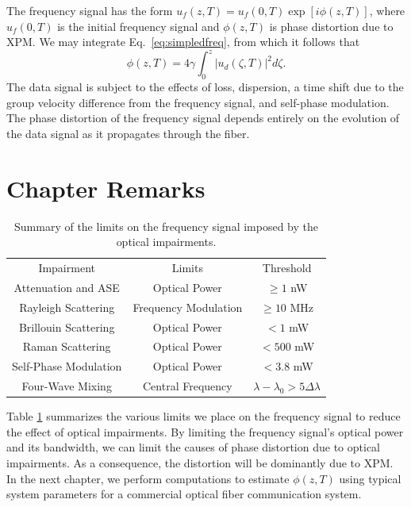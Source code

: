 The frequency signal has the form $u_f(z,T) = u_f(0,T)\exp[i\phi(z,T)]$, where $u_f(0,T)$ is the initial frequency signal and $\phi(z,T)$ is phase distortion due to XPM. We may integrate Eq.~\ref{eq:simpledfreq}, from which it follows that
%
\begin{equation} \label{eq:phasedistort}
	\phi(z,T) = 4\gamma\int_0^{z} |u_d(\zeta, T)|^2 d\zeta.
\end{equation}
%
The data signal is subject to the effects of loss, dispersion, a time shift due to the group velocity difference from the frequency signal, and self-phase modulation. The phase distortion of the frequency signal depends entirely on the evolution of the data signal as it propagates through the fiber.

\section{Chapter Remarks} \label{sec:3conc}

\renewcommand{\baselinestretch}{1}
\small\normalsize

\begin{table}[h]
	\raggedright
	\begin{tabular}{| c | c | c |}
		\hline
		Impairment & Limits & Threshold \\ \hhline{|=|=|=|}
		Attenuation and ASE & Optical Power & $\ge 1$ nW \\ \hline
		Rayleigh Scattering & Frequency Modulation & $\ge 10$ MHz \\ \hline
		Brillouin Scattering & Optical Power & $< 1$ mW \\ \hline
		Raman Scattering & Optical Power & $< 500$ mW \\ \hline
		Self-Phase Modulation & Optical Power & $< 3.8$ mW \\ \hline
		Four-Wave Mixing & Central Frequency & $\lambda - \lambda_0 > 5\Delta\lambda$ \\ 
		\hline
	\end{tabular}
	\caption{Summary of the limits on the frequency signal imposed by the optical impairments. \label{table:limits}}
\end{table}

\renewcommand{\baselinestretch}{2}
\small\normalsize

Table \ref{table:limits} summarizes the various limits we place on the frequency signal to reduce the effect of optical impairments. By limiting the frequency signal's optical power and its bandwidth, we can limit the causes of phase distortion due to optical impairments. As a consequence, the distortion will be dominantly due to XPM. In the next chapter, we perform computations to estimate $\phi(z,T)$ using typical system parameters for a commercial optical fiber communication system.

